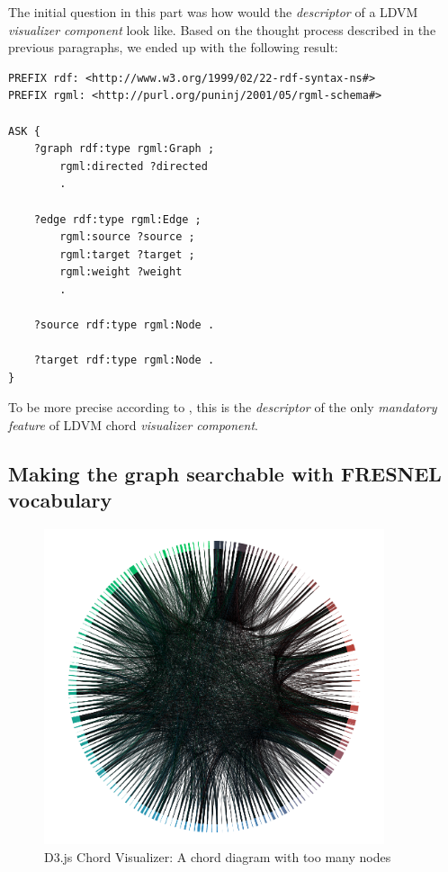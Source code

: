 The initial question in this part was how would the \emph{descriptor} of a LDVM \emph{visualizer component} look like. Based on the thought process described in the previous paragraphs, we ended up with the following result:

\begin{verbatim}
PREFIX rdf: <http://www.w3.org/1999/02/22-rdf-syntax-ns#>
PREFIX rgml: <http://purl.org/puninj/2001/05/rgml-schema#>

ASK {
    ?graph rdf:type rgml:Graph ;
        rgml:directed ?directed 
        .
            
    ?edge rdf:type rgml:Edge ;
        rgml:source ?source ;
        rgml:target ?target ;
        rgml:weight ?weight 
        .
            
    ?source rdf:type rgml:Node .
    
    ?target rdf:type rgml:Node .
}
\end{verbatim}

To be more precise according to \cite{ldvm_use_cases}, this is the \emph{descriptor} of the only \emph{mandatory feature} of LDVM chord \emph{visualizer component}.

\subsection{Making the graph searchable with FRESNEL vocabulary}
\label{sec:visualizers:chord:fresnel}

\begin{figure}
	\centering
	\includegraphics[width=100mm]{img/06_chord_too_many_nodes}
	\caption{D3.js Chord Visualizer: A chord diagram with too many nodes}
    \label{fig:chord-too-many-nodes}
\end{figure}

